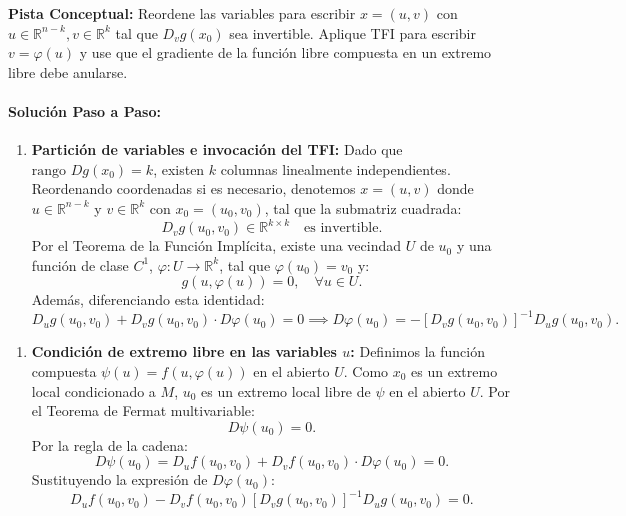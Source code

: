 \documentclass[11pt,a4paper]{article}
\begin{document}
\begin{tcolorbox}[colback=yellow!4,colframe=accentamber!70,arc=1mm,boxrule=0.5pt,left=3mm,right=3mm,top=1.5mm,bottom=1.5mm]
\textbf{Pista Conceptual:} Reordene las variables para escribir $x = (u,v)$ con $u\in\mathbb{R}^{n-k}, v\in\mathbb{R}^k$ tal que $D_v g(x_0)$ sea invertible. Aplique TFI para escribir $v = \varphi(u)$ y use que el gradiente de la función libre compuesta en un extremo libre debe anularse.
\end{tcolorbox}

\paragraph{Solución Paso a Paso:}\par
\begin{enumerate}[label=\textbf{\arabic*.}]
\item \textbf{Partición de variables e invocación del TFI:}
Dado que $\text{rango } Dg(x_0) = k$, existen $k$ columnas linealmente independientes. Reordenando coordenadas si es necesario, denotemos $x = (u, v)$ donde $u \in \mathbb{R}^{n-k}$ y $v \in \mathbb{R}^k$ con $x_0 = (u_0, v_0)$, tal que la submatriz cuadrada:
\begin{equation*}
D_v g(u_0, v_0) \in \mathbb{R}^{k \times k} \quad \text{es invertible}.
\end{equation*}
Por el Teorema de la Función Implícita, existe una vecindad $U$ de $u_0$ y una función de clase $C^1$, $\varphi: U \to \mathbb{R}^k$, tal que $\varphi(u_0) = v_0$ y:
\begin{equation*}
g(u, \varphi(u)) = 0, \quad \forall u \in U.
\end{equation*}
Además, diferenciando esta identidad:
\begin{equation*}
D_u g(u_0, v_0) + D_v g(u_0, v_0) \cdot D\varphi(u_0) = 0 \implies D\varphi(u_0) = - [D_v g(u_0, v_0)]^{-1} D_u g(u_0, v_0).
\end{equation*}
\end{enumerate}

\begin{enumerate}[label=\textbf{\arabic*.}]
\item \textbf{Condición de extremo libre en las variables $u$:}
Definimos la función compuesta $\psi(u) = f(u, \varphi(u))$ en el abierto $U$.
Como $x_0$ es un extremo local condicionado a $M$, $u_0$ es un extremo local libre de $\psi$ en el abierto $U$.
Por el Teorema de Fermat multivariable:
\begin{equation*}
D\psi(u_0) = 0.
\end{equation*}
Por la regla de la cadena:
\begin{equation*}
D\psi(u_0) = D_u f(u_0, v_0) + D_v f(u_0, v_0) \cdot D\varphi(u_0) = 0.
\end{equation*}
Sustituyendo la expresión de $D\varphi(u_0)$:
\begin{equation*}
D_u f(u_0, v_0) - D_v f(u_0, v_0) [D_v g(u_0, v_0)]^{-1} D_u g(u_0, v_0) = 0.
\end{equation*}
\end{enumerate}
\end{document}
